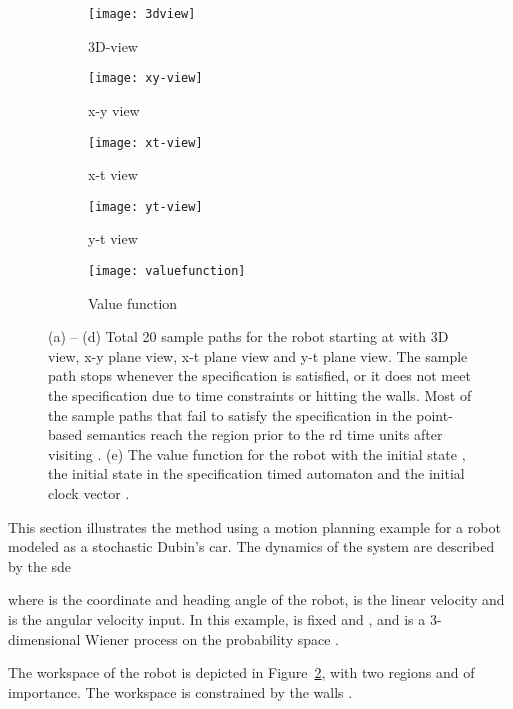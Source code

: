 \documentclass[letterpaper, 10 pt, conference]{ieeeconf}
\begin{document}
\begin{figure*}[!t]
\centering
    \begin{subfigure}[b]{0.45\textwidth}
\centering
\texttt{[image: 3dview]}
\caption{3D-view}
\label{fig:3d-view}
\end{subfigure}
    \begin{subfigure}[b]{0.45\textwidth}
\centering
\texttt{[image: xy-view]}
\caption{x-y view}
\label{fig:xy-view}
\end{subfigure}
    \begin{subfigure}[b]{0.45\textwidth}
\centering
\texttt{[image: xt-view]}
\caption{x-t view}
\label{fig:xt-view}
\end{subfigure}
    \begin{subfigure}[b]{0.45\textwidth}
\centering
\texttt{[image: yt-view]}
\caption{y-t view}
\label{fig:yt-view}
\end{subfigure}
\vspace{-2ex}
\begin{subfigure}[b]{0.5\textwidth}
\centering
\texttt{[image: valuefunction]}
\caption{Value function}
\label{fig:valuefunction}
\end{subfigure}
\label{fig:simulation}
\caption{(a) -- (d) Total 20 sample paths for the robot starting at
   with 3D view, x-y plane view, x-t plane view and
  y-t plane view. The sample path stops whenever the specification is
  satisfied, or it does not meet the specification due to time
  constraints or hitting the walls.  Most of the sample paths that
  fail to satisfy the specification in the point-based semantics reach
  the region  prior to the rd time units after visiting
  . (e) The value function for the robot with the initial state
  , the initial state in the specification
  timed automaton and the initial clock vector .}
\end{figure*}
This section illustrates the method using a motion planning example
for a robot modeled as a stochastic Dubin's car. The dynamics of the
system are described by the \ac{sde}
 
where  is the coordinate and heading angle of
the robot,  is the linear velocity and  is the
angular velocity input. In this example,  is fixed and
, and  is a 3-dimensional Wiener
process on the probability space .

The workspace of the robot is depicted in Figure~\ref{fig:xy-view},
with two regions  and  of importance. The workspace is
constrained by the walls
.
\end{document}
